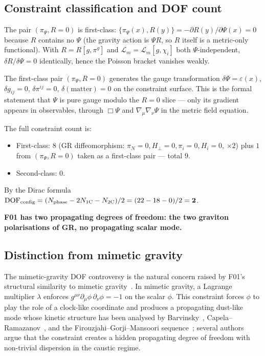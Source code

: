 \documentclass[aps,prd,twocolumn,nofootinbib,floatfix,superscriptaddress]{revtex4-2}
\newcommand{\Lm}{\mathcal{L}_m}
\begin{document}
\subsection{Constraint classification and DOF count}

The pair $(\pi_\Psi, R=0)$ is first-class:
$\{\pi_\Psi(x),R(y)\}=-\partial R(y)/\partial\Psi(x)=0$ because $R$
contains no $\Psi$ (the gravity action is $\Psi R$, so $R$ itself
is a metric-only functional). With $R=R[g,\pi^g]$ and
$\Lm=\Lm[g,\chi_i]$ both $\Psi$-independent,
$\delta R/\delta\Psi=0$ identically, hence the Poisson bracket
vanishes weakly.

The first-class pair $(\pi_\Psi, R=0)$ generates the gauge
transformation $\delta\Psi=\varepsilon(x)$, $\delta g_{ij}=0$,
$\delta\pi^{ij}=0$, $\delta(\text{matter})=0$ on the constraint
surface. This is the formal statement that $\Psi$ is pure gauge
modulo the $R=0$ slice --- only its gradient appears in observables,
through $\Box\Psi$ and $\nabla_\mu\nabla_\nu\Psi$ in the metric
field equation.

The full constraint count is:
\begin{itemize}
\item First-class: $8$ (GR diffeomorphism: $\pi_N=0,H_\perp=0,\pi_i=0,H_i=0$, $\times 2$) plus $1$ from $(\pi_\Psi,R=0)$ taken as a first-class pair --- total $9$.
\item Second-class: $0$.
\end{itemize}
By the Dirac formula
$\text{DOF}_{\rm config} = (N_{\rm phase} - 2 N_{\rm 1C} - N_{\rm 2C})/2
= (22 - 18 - 0)/2 = \mathbf{2}$.

\textbf{F01 has two propagating degrees of freedom: the two graviton
polarisations of GR, no propagating scalar mode.}

\subsection{Distinction from mimetic gravity}

The mimetic-gravity DOF controversy is the natural concern raised
by F01's structural similarity to mimetic
gravity~\cite{ChamseddineMukhanov2013}. In mimetic gravity, a
Lagrange multiplier $\lambda$ enforces
$g^{\mu\nu}\partial_\mu\phi\,\partial_\nu\phi = -1$ on the scalar
$\phi$. This constraint forces $\phi$ to play the role of a
clock-like coordinate and produces a propagating dust-like mode
whose kinetic structure has been analysed by
Barvinsky~\cite{Barvinsky2014},
Capela--Ramazanov~\cite{Capela2015}, and the
Firouzjahi--Gorji--Mansoori
sequence~\cite{Firouzjahi2017,Gorji2018}; several authors argue
that the constraint creates a hidden propagating degree of freedom
with non-trivial dispersion in the caustic regime.
\end{document}
